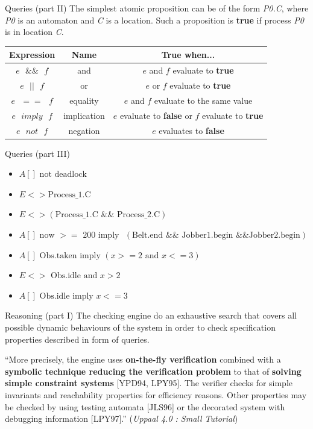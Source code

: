 \documentclass{beamer}
\begin{document}
\begin{frame}{Queries (part II)}
	The simplest atomic proposition can be of the form \textit{P0.C}, where \textit{P0} is an automaton and \textit{C} is a location. Such a proposition is \textbf{true} if process \textit{P0} is in location \textit{C}.\newline
	
	\begin{tabular}{|c|c|c|}
		\hline \textbf{Expression} & \textbf{Name} & \textbf{True when...} \\ 
		\hline $e\text{ }\&\&\text{ }f$ & and & $e$ and $f$ evaluate to \textbf{true}	 \\ 
		\hline $e\text{ }||\text{ }f$ & or & $e$ or $f$ evaluate to \textbf{true} \\ 
		\hline $e\text{ }==\text{ }f$ & equality & $e$ and $f$ evaluate to the same value \\ 
		\hline $e\text{ }imply\text{ }f$ & implication & $e$ evaluate to \textbf{false} or $f$ evaluate to \textbf{true}\\ 
		\hline $e\text{ }not\text{ }f$ & negation & $e$ evaluates to \textbf{false} \\ 
		\hline 
	\end{tabular} 

\end{frame}

\begin{frame}{Queries (part III)}
	\begin{itemize}
		\item $A[] \text{ not deadlock}$
		\item $E<> \text{Process\_1.C}$
		\item $E<> (\text{Process\_1.C } \&\& \text{ Process\_2.C})$
		\item $A[] \text{ now } >= \text{ 200 imply }$
		$(\text{Belt.end } \&\& \text{ Jobber1.begin } \&\& \text{Jobber2.begin})$
		\item $A[] \text{ Obs.taken imply } (x>=2 \text{ and } x<=3)$
		\item $E<> \text{ Obs.idle and } x>2$
		\item $A[] \text{ Obs.idle imply } x<=3$
		
	\end{itemize}
\end{frame}

\begin{frame}{Reasoning (part I)}
	The checking engine do an exhaustive search	that covers all possible dynamic behaviours of the system in order to check specification properties described in form of queries.\newline


	``More precisely, the engine uses \textbf{on-the-fly verification} combined with a \textbf{symbolic technique reducing the verification problem} to that of \textbf{solving simple constraint systems} [YPD94, LPY95]. The verifier checks for simple invariants and reachability properties for efficiency reasons. Other properties may be checked by using testing automata [JLS96] or the decorated system with debugging	information [LPY97].'' (\textit{Uppaal 4.0 : Small Tutorial})
	
\end{frame}
\end{document}
